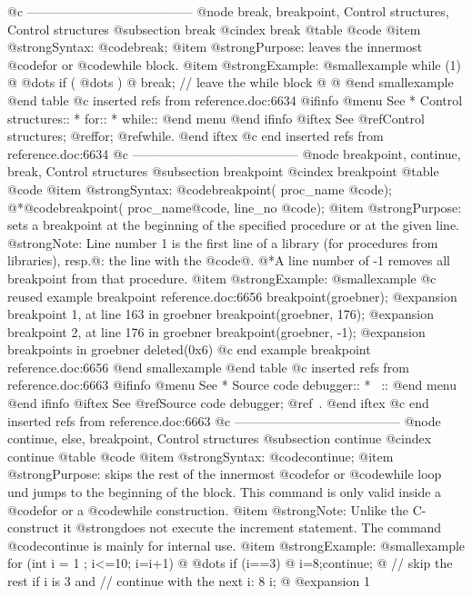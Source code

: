 {{{{{{{@c ---------------------------------------
@node break, breakpoint, Control structures, Control structures
@subsection break
@cindex break
@table @code
@item @strong{Syntax:}
@code{break;}
@item @strong{Purpose:}
leaves the innermost @code{for} or @code{while} block.
@item @strong{Example:}
@smallexample
while (1)
@{
  @dots{}
  if ( @dots{} )
  @{
    break; // leave the while block
  @}
@}
@end smallexample
@end table
@c inserted refs from reference.doc:6634
@ifinfo
@menu
See
* Control structures::
* for::
* while::
@end menu
@end ifinfo
@iftex
See
@ref{Control structures};
@ref{for};
@ref{while}.
@end iftex
@c end inserted refs from reference.doc:6634
@c ---------------------------------------
@node breakpoint, continue, break, Control structures
@subsection breakpoint
@cindex breakpoint
@table @code
@item @strong{Syntax:}
@code{breakpoint(} proc_name @code{);}
@*@code{breakpoint(} proc_name@code{,} line_no @code{);}
@item @strong{Purpose:}
sets a breakpoint at the beginning of the specified procedure or
at the given line.
@strong{Note:} Line number 1 is the first line of a library (for
procedures from libraries), resp.@: the line with the @code{@{}.
@*A line number of -1 removes all breakpoint from that procedure.
@item @strong{Example:}
@smallexample
@c reused example breakpoint reference.doc:6656 
breakpoint(groebner);
@expansion{} breakpoint 1, at line 163 in groebner
breakpoint(groebner, 176);
@expansion{} breakpoint 2, at line 176 in groebner
breakpoint(groebner, -1);
@expansion{} breakpoints in groebner deleted(0x6)
@c end example breakpoint reference.doc:6656
@end smallexample
@end table
@c inserted refs from reference.doc:6663
@ifinfo
@menu
See
* Source code debugger::
* ~::
@end menu
@end ifinfo
@iftex
See
@ref{Source code debugger};
@ref{~}.
@end iftex
@c end inserted refs from reference.doc:6663
@c ---------------------------------------
@node continue, else, breakpoint, Control structures
@subsection continue
@cindex continue
@table @code
@item @strong{Syntax:}
@code{continue;}
@item @strong{Purpose:}
skips the rest of the innermost @code{for} or @code{while} loop und jumps
to the beginning of the block. This command is only valid inside a
@code{for} or a @code{while} construction.
@item @strong{Note:}
Unlike the C-construct it @strong{does not execute the increment statement}.
The command @code{continue} is mainly for internal use.
@item @strong{Example:}
@smallexample
for (int i = 1 ; i<=10; i=i+1)
@{
   @dots{}
   if (i==3) @{ i=8;continue; @}
     // skip the rest if i is 3 and
     // continue with the next i: 8
   i;
@}
@expansion{} 1
}}}}}}}}
